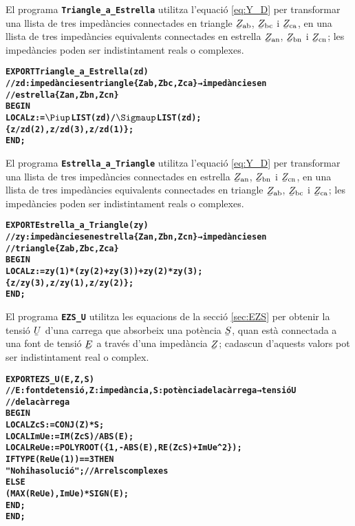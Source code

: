 El programa \texttt{\textbf{Triangle\_a\_Estrella}} utilitza l'equació \eqref{eq:Y_D} per transformar una llista de tres impedàncies connectades en triangle $\cmplx{Z}\ped{ab}$, $\cmplx{Z}\ped{bc}$ i  $\cmplx{Z}\ped{ca}$, en una llista de tres impedàncies equivalents connectades en estrella $\cmplx{Z}\ped{an}$, $\cmplx{Z}\ped{bn}$ i $\cmplx{Z}\ped{cn}$; les impedàncies poden ser indistintament reals o complexes.
\vspace{-6mm}
\begin{alltt}
\bfseries
{}
    EXPORT Triangle_a_Estrella(zd)
    // zd:impedàncies en triangle \{Zab,Zbc,Zca\} → impedàncies en
    // estrella \{Zan,Zbn,Zcn\}
    BEGIN
      LOCAL z:=\(\Piup\)LIST(zd)/\(\Sigmaup\)LIST(zd);
      \{z/zd(2),z/zd(3),z/zd(1)\};
    END;
\end{alltt}

El programa \texttt{\textbf{Estrella\_a\_Triangle}} utilitza l'equació \eqref{eq:Y_D} per transformar una llista de tres impedàncies connectades en estrella $\cmplx{Z}\ped{an}$, $\cmplx{Z}\ped{bn}$ i $\cmplx{Z}\ped{cn}$, en una llista de tres impedàncies equivalents connectades en triangle $\cmplx{Z}\ped{ab}$, $\cmplx{Z}\ped{bc}$ i  $\cmplx{Z}\ped{ca}$; les impedàncies poden ser indistintament reals o complexes.
\vspace{-6mm}
\begin{alltt}
\bfseries
{}
    EXPORT Estrella_a_Triangle(zy)
    // zy:impedàncies en estrella \{Zan,Zbn,Zcn\} → impedàncies en
    // triangle \{Zab,Zbc,Zca\}
    BEGIN
      LOCAL z:=zy(1)*(zy(2)+zy(3))+zy(2)*zy(3);
      \{z/zy(3),z/zy(1),z/zy(2)\};
    END;
\end{alltt}

El programa \texttt{\textbf{EZS\_U}} utilitza les equacions de la secció \vref{sec:EZS} per obtenir la tensió $\cmplx{U}$ d'una carrega que absorbeix una potència $\cmplx{S}$, quan està connectada a una font de tensió $\cmplx{E}$ a través d'una impedància $\cmplx{Z}$; cadascun d'aquests valors pot ser indistintament real o complex.
\vspace{-6mm}
\begin{alltt}
\bfseries
{}
    EXPORT EZS_U(E,Z,S)
    // E:font de tensió, Z:impedància, S:potència de la càrrega → tensió U
    // de la càrrega
    BEGIN
      LOCAL ZcS:=CONJ(Z)*S;
      LOCAL ImUe:=IM(ZcS)/ABS(E);
      LOCAL ReUe:=POLYROOT(\{1,-ABS(E),RE(ZcS)+ImUe^2\});
      IF TYPE(ReUe(1))==3 THEN
        "No hi ha solució"; // Arrels complexes
      ELSE
        (MAX(ReUe),ImUe)*SIGN(E);
      END;
    END;
\end{alltt}


